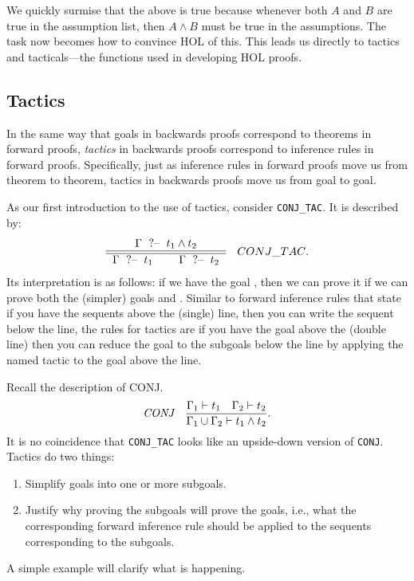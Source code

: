 We quickly surmise that the above is true because whenever both $A$
and $B$ are true in the assumption list, then $A \wedge B$ must be
true in the assumptions. The task now becomes how to convince HOL of
this.  This leads us directly to tactics and tacticals---the functions
used in developing HOL proofs.

\subsection{Tactics}

In the same way that goals in backwards proofs correspond to theorems
in forward proofs, \emph{tactics} in backwards proofs correspond to
inference rules in forward proofs.  Specifically, just as inference
rules in forward proofs move us from theorem to theorem, tactics in
backwards proofs move us from goal to goal.%

As our first introduction to the use of tactics, consider
\texttt{CONJ\_TAC}. It is described by:
\begin{gather*}
  \tac
        {\goals{\Gamma}{t_1 \wedge t_2}}
        {\goals{\Gamma}{t_1} \qquad \goals{\Gamma}{t_2}}
        {CONJ\_TAC}.
\end{gather*}
Its interpretation is as follows: if we have the goal
, then we can prove it if we can prove
both the (simpler) goals  and
. Similar to forward inference rules that state if
you have the sequents above the (single) line, then you can write the
sequent below the line, the rules for tactics are if you have the goal
above the (double line) then you can reduce the goal to the subgoals
below the line by applying the named tactic to the goal above the
line.

Recall the description of CONJ.
\begin{gather*}
  \irule
  {\seqs{\Gamma_1}{t_1} \quad \seqs{\Gamma_2}{t_2}}
  {\seqs{\Gamma_1 \cup \Gamma_2}{t_1 \wedge t_2}}
  {CONJ}.
\end{gather*}
It is no coincidence that \texttt{CONJ\_TAC} looks like an upside-down
version of \texttt{CONJ}. Tactics do two things:
\begin{enumerate}
\item Simplify goals into one or more subgoals.
\item Justify why proving the subgoals will prove the goals, i.e.,
  what the corresponding forward inference rule should be applied to
  the sequents corresponding to the subgoals.
\end{enumerate}
A simple example will clarify what is happening.


